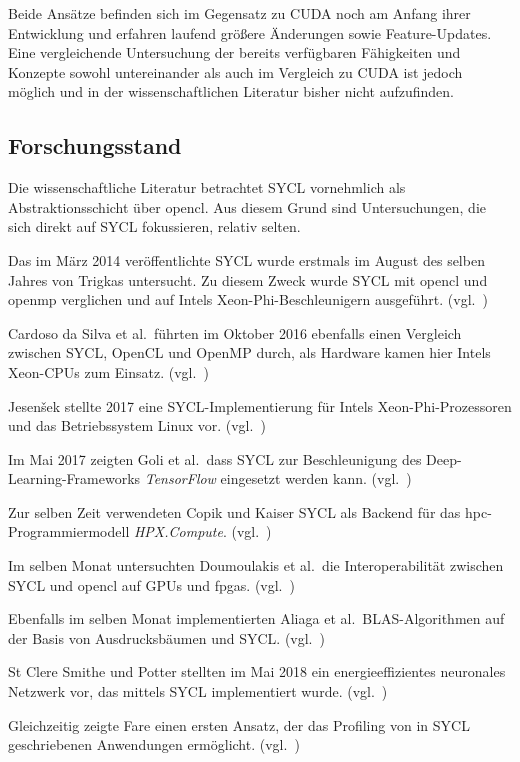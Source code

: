 Beide Ansätze befinden sich im Gegensatz zu CUDA noch am Anfang ihrer
Entwicklung und erfahren laufend größere Änderungen sowie Feature-Updates. Eine
vergleichende Untersuchung der bereits verfügbaren Fähigkeiten und Konzepte 
sowohl untereinander als auch im Vergleich zu CUDA ist jedoch möglich und in
der wissenschaftlichen Literatur bisher nicht aufzufinden.

\subsection{Forschungsstand}
\label{einleitung:forschung}

Die wissenschaftliche Literatur betrachtet SYCL vornehmlich als
Abstraktionsschicht über \gls{opencl}. Aus diesem Grund sind Untersuchungen, die
sich direkt auf SYCL fokussieren, relativ selten.

Das im März 2014 veröffentlichte SYCL wurde erstmals im August des selben Jahres
von Trigkas untersucht. Zu diesem Zweck wurde SYCL mit \gls{opencl} und
\gls{openmp} verglichen und auf Intels Xeon-Phi-Beschleunigern ausgeführt.
(vgl.~\cite{trigkas2014})

Cardoso da Silva et al.\ führten im Oktober 2016 ebenfalls einen Vergleich
zwischen SYCL, OpenCL und OpenMP durch, als Hardware kamen hier Intels Xeon-CPUs
zum Einsatz.
(vgl.~\cite{dasilva2016})

Jesenšek stellte 2017 eine SYCL-Implementierung für Intels
Xeon-Phi-Prozessoren und das Betriebssystem Linux vor.
(vgl.~\cite{jesensek2017})

Im Mai 2017 zeigten Goli et al.\, dass SYCL zur Beschleunigung des
Deep-Learning-Frameworks \textit{TensorFlow} eingesetzt werden kann.
(vgl.~\cite{goli2017})

Zur selben Zeit verwendeten Copik und Kaiser SYCL als Backend für das
\gls{hpc}-Programmiermodell \textit{HPX.Compute}.
(vgl.~\cite{copik2017})

Im selben Monat untersuchten Doumoulakis et al.\ die Interoperabilität zwischen
SYCL und \gls{opencl} auf GPUs und \gls{fpga}s.
(vgl.~\cite{doumoulakis2017})

Ebenfalls im selben Monat implementierten Aliaga et al.\ BLAS-Algorithmen auf
der Basis von Ausdrucksbäumen und SYCL.
(vgl.~\cite{aliaga2017})

St Clere Smithe und Potter stellten im Mai 2018 ein energieeffizientes
neuronales Netzwerk vor, das mittels SYCL implementiert wurde.
(vgl.~\cite{stcleresmithe2018})

Gleichzeitig zeigte Fare einen ersten Ansatz, der das Profiling von in SYCL
geschriebenen Anwendungen ermöglicht.
(vgl.~\cite{fare2018})

